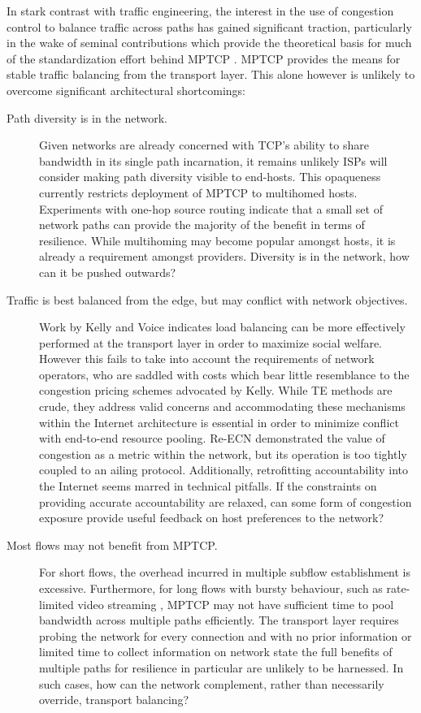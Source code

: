 In stark contrast with traffic engineering, the interest in the use of congestion control to balance traffic across paths has gained significant traction, particularly in the wake of seminal contributions \cite{Key:2007p130,Kelly:2005p140} which provide the theoretical basis for much of the standardization effort behind \ac{MPTCP} \cite{Wischik:2008p137}. 
\ac{MPTCP} provides the means for stable traffic balancing from the transport layer.
This alone however is unlikely to overcome significant architectural shortcomings:

\begin{description}
\item[Path diversity is in the network.]{
    Given networks are already concerned with \ac{TCP}'s ability to share bandwidth in its single path incarnation, it remains unlikely \acp{ISP} will consider making path diversity visible to end-hosts. 
    This opaqueness currently restricts deployment of \ac{MPTCP} to multihomed hosts. 
    Experiments with one-hop source routing \cite{Gummadi:2004p131} indicate that a small set of network paths can provide the majority of the benefit in terms of resilience. 
    While multihoming may become popular amongst hosts, it is already a requirement amongst providers. 
    Diversity is in the network, how can it be pushed outwards?
}

\item[Traffic is best balanced from the edge, but may conflict with network objectives.]{
    Work by Kelly and Voice \cite{Kelly:2005p140} indicates load balancing can be more effectively performed at the transport layer in order to maximize social welfare.
    However this fails to take into account the requirements of network operators, who are saddled with costs which bear little resemblance to the congestion pricing schemes advocated by Kelly.
    While \ac{TE} methods are crude, they address valid concerns and accommodating these mechanisms within the Internet architecture is essential in order to minimize conflict with end-to-end resource pooling. 
    Re-\ac{ECN} \cite{Briscoe:2008p494} demonstrated the value of congestion as a metric within the network, but its operation is too tightly coupled to an ailing protocol. 
    Additionally, retrofitting accountability into the Internet seems marred in technical pitfalls.
    If the constraints on providing accurate accountability are relaxed, can some form of congestion exposure provide useful feedback on host preferences to the network?
}

\item[Most flows may not benefit from \ac{MPTCP}.]{
    For short flows, the overhead incurred in multiple subflow establishment is excessive.
    Furthermore, for long flows with bursty behaviour, such as rate-limited video streaming \cite{Rao:2011p547}, \ac{MPTCP} may not have sufficient time to pool bandwidth across multiple paths efficiently.
    The transport layer requires probing the network for every connection and with no prior information or limited time to collect information on network state the full benefits of multiple paths for resilience in particular are unlikely to be harnessed.
    In such cases, how can the network complement, rather than necessarily override, transport balancing?
}


\end{description}
